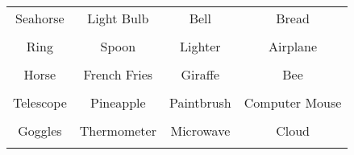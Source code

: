 \documentclass[12pt,a4paper]{article}
\begin{document}
\thispagestyle{empty}
\begin{table}[]
\centering
\Huge
\begin{tabular}{cccc}
 Seahorse& Light Bulb& Bell& Bread\\  & & & \\
 Ring& Spoon& Lighter& Airplane\\  & & & \\
 Horse& French Fries& Giraffe& Bee\\  & & & \\
 Telescope& Pineapple& Paintbrush& Computer Mouse\\  & & & \\
 Goggles& Thermometer& Microwave& Cloud\\  & & & \\
\end{tabular}
\end{table}
\end{document}
